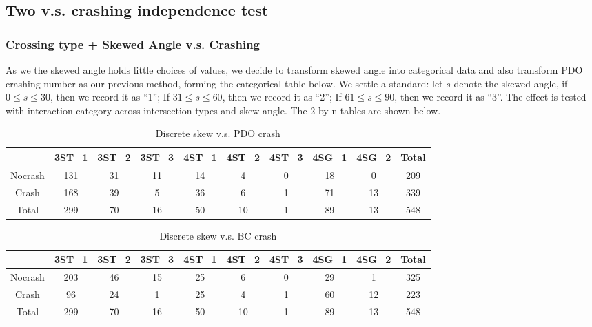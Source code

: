 \documentclass[11pt]{scrartcl} %
\begin{document}
\subsection{Two v.s. crashing independence test}

\subsubsection{Crossing type + Skewed Angle v.s. Crashing}

As we the skewed angle holds little choices of values, we decide to transform skewed angle into categorical data and also transform PDO crashing number as our previous method, forming the categorical table below. We settle a standard: let $s$ denote the skewed angle, if $0 \le s \le 30$, then we record it as ``1''; If $31 \le s \le 60$, then we record it as ``2''; If $61 \le s \le 90$, then we record it as ``3''. The effect is tested with interaction category across intersection types and skew angle. The 2-by-n tables are shown below.

\begin{table}[H]
\caption{Discrete skew v.s. PDO crash}
\centering
\begin{tabular}{|c|c|c|c|c|c|c|c|c|c|}
\hline
      & 3ST\_1 & 3ST\_2 & 3ST\_3 & 4ST\_1 & 4ST\_2 & 4ST\_3 & 4SG\_1 & 4SG\_2 & Total \\
\hline
Nocrash & 131 & 31  & 11 & 14 & 4 & 0 & 18 & 0 & 209\\
\hline
Crash    & 168  & 39  & 5  & 36 & 6 & 1 & 71 & 13 & 339\\
\hline
Total    & 299  & 70  & 16  & 50 & 10 & 1 & 89 & 13 & 548 \\
\hline
\end{tabular}
\end{table}

\begin{table}[H]
\caption{Discrete skew v.s. BC crash}
\centering
\begin{tabular}{|c|c|c|c|c|c|c|c|c|c|}
\hline
      & 3ST\_1 & 3ST\_2 & 3ST\_3 & 4ST\_1 & 4ST\_2 & 4ST\_3 & 4SG\_1 & 4SG\_2 & Total \\
\hline
Nocrash & 203 & 46  & 15 & 25 & 6 & 0 &  29 & 1 & 325\\
\hline
Crash    & 96  & 24  & 1  &  25 & 4 & 1 & 60 & 12 & 223\\
\hline
Total    & 299  & 70  & 16  & 50 & 10 & 1 & 89 & 13 & 548 \\
\hline
\end{tabular}
\end{table}
\end{document}
